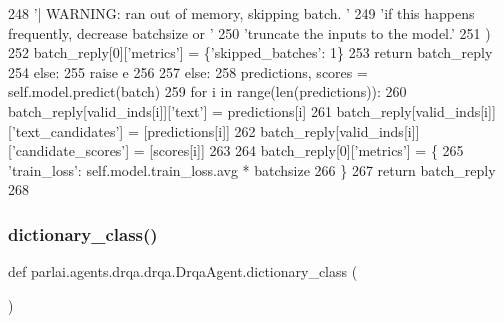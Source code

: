 \begin{DoxyCode}
248                         \textcolor{stringliteral}{'| WARNING: ran out of memory, skipping batch. '}
249                         \textcolor{stringliteral}{'if this happens frequently, decrease batchsize or '}
250                         \textcolor{stringliteral}{'truncate the inputs to the model.'}
251                     )
252                     batch\_reply[0][\textcolor{stringliteral}{'metrics'}] = \{\textcolor{stringliteral}{'skipped\_batches'}: 1\}
253                     \textcolor{keywordflow}{return} batch\_reply
254                 \textcolor{keywordflow}{else}:
255                     \textcolor{keywordflow}{raise} e
256 
257         \textcolor{keywordflow}{else}:
258             predictions, scores = self.model.predict(batch)
259             \textcolor{keywordflow}{for} i \textcolor{keywordflow}{in} range(len(predictions)):
260                 batch\_reply[valid\_inds[i]][\textcolor{stringliteral}{'text'}] = predictions[i]
261                 batch\_reply[valid\_inds[i]][\textcolor{stringliteral}{'text\_candidates'}] = [predictions[i]]
262                 batch\_reply[valid\_inds[i]][\textcolor{stringliteral}{'candidate\_scores'}] = [scores[i]]
263 
264         batch\_reply[0][\textcolor{stringliteral}{'metrics'}] = \{
265             \textcolor{stringliteral}{'train\_loss'}: self.model.train\_loss.avg * batchsize
266         \}
267         \textcolor{keywordflow}{return} batch\_reply
268 
\end{DoxyCode}
\mbox{\label{classparlai_1_1agents_1_1drqa_1_1drqa_1_1DrqaAgent_a1d925f46a6b35d1f10cb033a1184841d}} 
\subsubsection{\texorpdfstring{dictionary\+\_\+class()}{dictionary\_class()}}
{\footnotesize\ttfamily def parlai.\+agents.\+drqa.\+drqa.\+Drqa\+Agent.\+dictionary\+\_\+class (\begin{DoxyParamCaption}{ }\end{DoxyParamCaption})\hspace{0.3cm}{\ttfamily [static]}}



